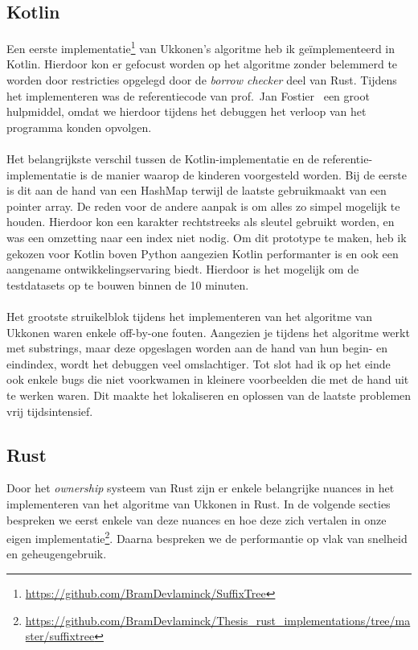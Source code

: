 \subsection{Kotlin}\label{subsec:kotlin}
Een eerste implementatie\footnote{\url{https://github.com/BramDevlaminck/SuffixTree}} van Ukkonen's algoritme heb ik geïmplementeerd in Kotlin.
Hierdoor kon er gefocust worden op het algoritme zonder belemmerd te worden door restricties opgelegd door de \textit{borrow checker} deel van Rust.
Tijdens het implementeren was de referentiecode van prof.~Jan Fostier~\cite{Ukkonen_CCB} een groot hulpmiddel, omdat we hierdoor tijdens het debuggen het verloop van het programma konden opvolgen.
\\ \\
Het belangrijkste verschil tussen de Kotlin-implementatie en de referentie-implementatie is de manier waarop de kinderen voorgesteld worden.
Bij de eerste is dit aan de hand van een HashMap terwijl de laatste gebruikmaakt van een pointer array.
De reden voor de andere aanpak is om alles zo simpel mogelijk te houden.
Hierdoor kon een karakter rechtstreeks als sleutel gebruikt worden, en was een omzetting naar een index niet nodig.
Om dit prototype te maken, heb ik gekozen voor Kotlin boven Python aangezien Kotlin performanter is en ook een aangename ontwikkelingservaring biedt.
Hierdoor is het mogelijk om de testdatasets op te bouwen binnen de 10 minuten.
\\ \\
Het grootste struikelblok tijdens het implementeren van het algoritme van Ukkonen waren enkele off-by-one fouten.
Aangezien je tijdens het algoritme werkt met substrings, maar deze opgeslagen worden aan de hand van hun begin- en eindindex, wordt het debuggen veel omslachtiger.
Tot slot had ik op het einde ook enkele bugs die niet voorkwamen in kleinere voorbeelden die met de hand uit te werken waren.
Dit maakte het lokaliseren en oplossen van de laatste problemen vrij tijdsintensief.

\subsection{Rust}\label{subsec:rust}
Door het \textit{ownership} systeem van Rust zijn er enkele belangrijke nuances in het implementeren van het algoritme van Ukkonen in Rust.
In de volgende secties bespreken we eerst enkele van deze nuances en hoe deze zich vertalen in onze eigen implementatie\footnote{\url{https://github.com/BramDevlaminck/Thesis_rust_implementations/tree/master/suffixtree}}.
Daarna bespreken we de performantie op vlak van snelheid en geheugengebruik.

